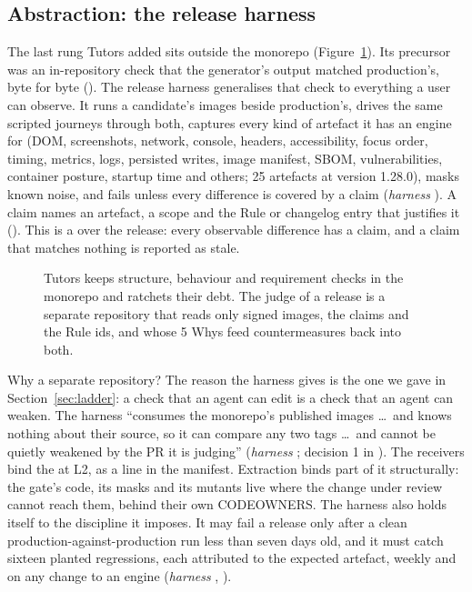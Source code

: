 \subsection{Abstraction: the release harness}

The last rung Tutors added sits outside the monorepo (Figure~\ref{fig:tutors-harness}). Its
precursor was an in-repository check that the generator's output matched production's, byte for
byte (). The release harness generalises that check to
everything a user can observe. It runs a candidate's images beside production's, drives the same
scripted journeys through both, captures every kind of artefact it has an engine for (DOM,
screenshots, network, console, headers, accessibility, focus order, timing, metrics, logs,
persisted writes, image manifest, SBOM, vulnerabilities, container posture, startup time and
others; 25 artefacts at version 1.28.0), masks known noise, and fails unless every difference is
covered by a claim (\emph{harness} ). A claim names an artefact, a scope and the
Rule or changelog entry that justifies it (). This is a
 over the release: every observable difference has a claim, and a claim
that matches nothing is reported as stale.

\begin{figure}[t]
  \centering
  \resizebox{0.92\linewidth}{!}{}
  \caption{Tutors keeps structure, behaviour and requirement checks in the monorepo and ratchets
  their debt. The judge of a release is a separate repository that reads only signed images, the
  claims and the Rule ids, and whose 5 Whys feed countermeasures back into both.}
  \label{fig:tutors-harness}
\end{figure}

Why a separate repository? The reason the harness gives is the one we gave in
Section~\ref{sec:ladder}: a check that an agent can edit is a check that an agent can weaken.
The harness ``consumes the monorepo's published images \ldots\ and knows nothing about their
source, so it can compare any two tags \ldots\ and cannot be quietly weakened by the PR it is
judging'' (\emph{harness} ; decision 1 in
). The receivers bind the  at
L2, as a line in the manifest. Extraction binds part of it structurally: the gate's code, its
masks and its mutants live where the change under review cannot reach them, behind their own
CODEOWNERS. The harness also holds itself to the discipline it imposes. It may fail a release
only after a clean production-against-production run less than seven days old, and it must
catch sixteen planted regressions, each attributed to the expected artefact, weekly and on any
change to an engine (\emph{harness} , ).

